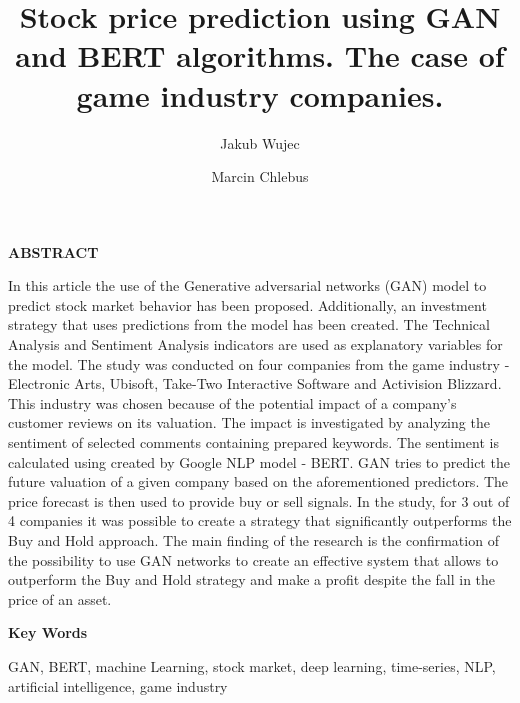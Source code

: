 \documentclass[review]{elsarticle} %
\begin{document}
       
       
\title{Stock price prediction using GAN and BERT algorithms. The case of game industry companies.}

\author[1]{Jakub Wujec%
}
\author[1]{Marcin Chlebus}


\maketitle

\mbox{}
\vfill


\begin{center}
\textbf{ABSTRACT}
\end{center}

\noindent In this article the use of the Generative adversarial networks (GAN) model to predict stock market behavior has been proposed. Additionally, an investment strategy that uses predictions from the model has been created. The Technical Analysis and Sentiment Analysis indicators are used as explanatory variables for the model. The study was conducted on four companies from the game industry -  Electronic Arts, Ubisoft, Take-Two Interactive Software and Activision Blizzard.  This industry was chosen because of the potential impact of a company's customer reviews on its valuation. The impact is investigated by analyzing the sentiment of selected comments containing prepared keywords. The sentiment is calculated using created by Google NLP model - BERT. GAN tries to predict the future valuation of a given company based on the aforementioned predictors. The price forecast is then used to provide buy or sell signals. In the study, for 3 out of 4 companies it was possible to create a strategy that significantly outperforms the Buy and Hold approach. The main finding of the research is the confirmation of the possibility to use GAN networks to create an effective system that allows to outperform the Buy and Hold strategy and make a profit despite the fall in the price of an asset.

\vspace{\baselineskip}

\begin{center}
\textbf{Key Words}

GAN, BERT, machine Learning, stock market, deep learning, time-series, NLP, artificial intelligence, game industry
\end{center}
\end{document}
